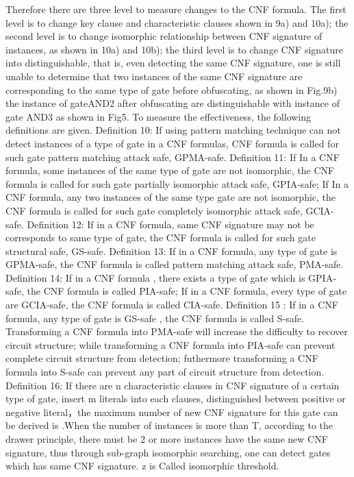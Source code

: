 \documentclass[runningheads,a4paper]{llncs}
\begin{document}
Therefore there are three level to measure changes to the CNF formula. The first level is to change key clause and characteristic clauses shown in 9a) and 10a); the second level is to change isomorphic relationship between CNF signature of instances, as shown in 10a) and 10b); the third level is to change CNF signature into distinguishable, that is, even detecting the same CNF signature, one is still unable to determine that two instances of the same CNF signature are corresponding to the same type of gate before obfuscating, as shown in Fig.9b) the instance of gateAND2 after obfuscating are distinguishable with instance of gate AND3 as shown in Fig5.
To measure the effectiveness, the following definitions are given.
Definition 10: If using pattern matching technique can not detect instances of a type of gate in a CNF formulas, CNF formula is called for such gate pattern matching attack safe, GPMA-safe.
Definition 11: If In a CNF formula, some instances of the same type of gate are not isomorphic, the CNF formula is called for such gate partially isomorphic attack safe, GPIA-safe; If In a CNF formula, any two instances of the same type gate are not isomorphic, the CNF formula is called for such gate completely isomorphic attack safe, GCIA-safe.
Definition 12: If in a CNF formula, same CNF signature may not be corresponds to same type of gate, the CNF formula is called for such gate structural safe, GS-safe.
Definition 13: If in a CNF formula, any type of gate is GPMA-safe, the CNF formula is called pattern matching attack safe, PMA-safe.
Definition 14: If in a CNF formula , there exists a type of gate which is GPIA-safe, the CNF formula is called PIA-safe; If in a CNF formula, every type of gate are GCIA-safe, the CNF formula is called CIA-safe.
Definition 15 : If in a CNF formula, any type of gate is GS-safe , the CNF formula is called S-safe.
Transforming a CNF formula into PMA-safe will increase the difficulty to recover circuit structure; while transforming a CNF formula into PIA-safe can prevent complete circuit structure from detection; futhermore  transforming a CNF formula into S-safe can prevent any part of circuit structure from detection.
Definition 16: If there are n characteristic clauses in CNF signature of a certain type of gate, insert m literals into each clauses, distinguished between positive or negative literal，the maximum number of new CNF signature for this gate can be derived is  .When the number of instances is more than T, according to the drawer principle, there must be 2 or more instances have the same new CNF signature, thus through sub-graph isomorphic searching, one can detect gates which has same CNF signature. z is Called isomorphic threshold.
\end{document}
